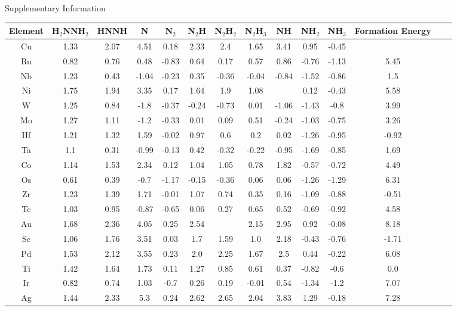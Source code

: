 Supplementary Information
\onecolumn
\begin{table}\begin{center}
\begin{tabular}{| c | c | c | c | c | c | c | c | c | c | c | c | c | c |}
\hline
Element & H$_2$NNH$_2$ & HNNH & N & N$_2$ & N$_2$H & N$_2$H$_2$ & N$_2$H$_3$ & NH & NH$_2$ & NH$_3$ & Formation Energy\\
\hline

Cu & 1.33 & 2.07 & 4.51 & 0.18 & 2.33 & 2.4 & 1.65 & 3.41 & 0.95 & -0.45 &  \\
Ru & 0.82 & 0.76 & 0.48 & -0.83 & 0.64 & 0.17 & 0.57 & 0.86 & -0.76 & -1.13 & 5.45 \\
Nb & 1.23 & 0.43 & -1.04 & -0.23 & 0.35 & -0.36 & -0.04 & -0.84 & -1.52 & -0.86 & 1.5 \\
Ni & 1.75 & 1.94 & 3.35 & 0.17 & 1.64 & 1.9 & 1.08 &  & 0.12 & -0.43 & 5.58 \\
W & 1.25 & 0.84 & -1.8 & -0.37 & -0.24 & -0.73 & 0.01 & -1.06 & -1.43 & -0.8 & 3.99 \\
Mo & 1.27 & 1.11 & -1.2 & -0.33 & 0.01 & 0.09 & 0.51 & -0.24 & -1.03 & -0.75 & 3.26 \\
Hf & 1.21 & 1.32 & 1.59 & -0.02 & 0.97 & 0.6 & 0.2 & 0.02 & -1.26 & -0.95 & -0.92 \\
Ta & 1.1 & 0.31 & -0.99 & -0.13 & 0.42 & -0.32 & -0.22 & -0.95 & -1.69 & -0.85 & 1.69 \\
Co & 1.14 & 1.53 & 2.34 & 0.12 & 1.04 & 1.05 & 0.78 & 1.82 & -0.57 & -0.72 & 4.49 \\
Os & 0.61 & 0.39 & -0.7 & -1.17 & -0.15 & -0.36 & 0.06 & 0.06 & -1.26 & -1.29 & 6.31 \\
Zr & 1.23 & 1.39 & 1.71 & -0.01 & 1.07 & 0.74 & 0.35 & 0.16 & -1.09 & -0.88 & -0.51 \\
Tc & 1.03 & 0.95 & -0.87 & -0.65 & 0.06 & 0.27 & 0.65 & 0.52 & -0.69 & -0.92 & 4.58 \\
Au & 1.68 & 2.36 & 4.05 & 0.25 & 2.54 &  & 2.15 & 2.95 & 0.92 & -0.08 & 8.18 \\
Sc & 1.06 & 1.76 & 3.51 & 0.03 & 1.7 & 1.59 & 1.0 & 2.18 & -0.43 & -0.76 & -1.71 \\
Pd & 1.53 & 2.12 & 3.55 & 0.23 & 2.0 & 2.25 & 1.67 & 2.5 & 0.44 & -0.22 & 6.08 \\
Ti & 1.42 & 1.64 & 1.73 & 0.11 & 1.27 & 0.85 & 0.61 & 0.37 & -0.82 & -0.6 & 0.0 \\
Ir & 0.82 & 0.74 & 1.03 & -0.7 & 0.26 & 0.19 & -0.01 & 0.54 & -1.34 & -1.2 & 7.07 \\
Ag & 1.44 & 2.33 & 5.3 & 0.24 & 2.62 & 2.65 & 2.04 & 3.83 & 1.29 & -0.18 & 7.28 \\

\end{tabular}
\end{center}
\end{table}
